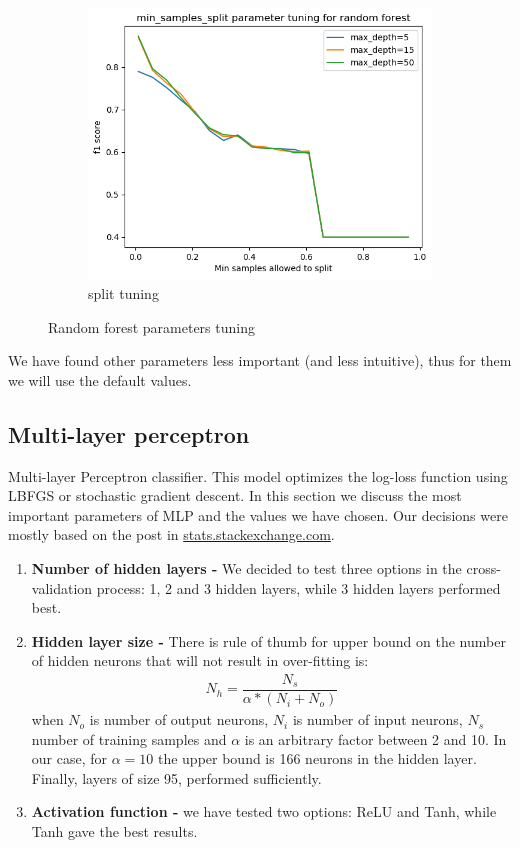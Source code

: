 \documentclass[12pt]{article}
\begin{document}
\begin{figure}[h]
\begin{subfigure}{0.3\textwidth}
  \includegraphics[width=1\linewidth]{Cross_valid_plots/s_hyper_forest_fig}
  \caption{split tuning}
  \label{fig:sub2}
\end{subfigure}
\caption{Random forest parameters tuning}
\label{fig:test}
\end{figure}

We have found other parameters less important (and less intuitive), thus for them we will use the default values.

\subsection{Multi-layer perceptron}
Multi-layer Perceptron classifier. This model optimizes the log-loss function using LBFGS or stochastic gradient descent. In this section we discuss the most important parameters of MLP and the values we have chosen. Our decisions were mostly based on the post in \href{https://stats.stackexchange.com/questions/181/how-to-choose-the-number-of-hidden-layers-and-nodes-in-a-feedforward-neural-netw}{stats.stackexchange.com}.
\begin{enumerate}
	\item \textbf{Number of hidden layers -} We decided to test three options in the cross-validation process: 1, 2 and 3 hidden layers, while 3 hidden layers performed best.
	\item \textbf{Hidden layer size -} There is rule of thumb for upper bound on the number of hidden neurons that will not result in over-fitting is:
\begin{gather*}
N_h = \dfrac{N_s}{\alpha * (N_i + N_o)}
\end{gather*}
when $N_o$ is number of output neurons, $N_i$ is number of input neurons, $N_s$ number of training samples and $\alpha$ is an arbitrary factor between 2 and 10. In our case, for $\alpha = 10$ the upper bound is 166 neurons in the hidden layer. Finally, layers of size 95, performed sufficiently. 
	\item \textbf{Activation function -} we have tested two options: ReLU and Tanh, while Tanh gave the best results. 
\end{enumerate}
\end{document}
